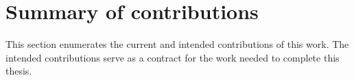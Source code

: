 \begin{itemln}
      \end{itemln}
        
    
    \section{Summary of contributions}\label{sec:contributions}
        This section enumerates the current and intended contributions of this work. The intended contributions
        serve as a contract for the work needed to complete this thesis.
      
